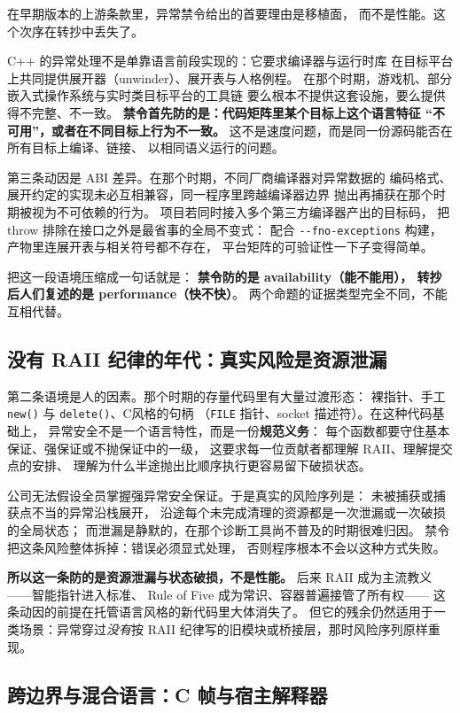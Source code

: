 \documentclass[12pt,a4paper,fontset=fandol]{ctexbook}
\newcommand{\Fn}[1]{\texttt{#1()}}
\newcommand{\Tp}[1]{\texttt{#1}}
\newcommand{\Opt}[1]{\texttt{-\/-#1}}
\newcommand{\Lang}[1]{\textsf{#1}}
\newcommand{\CL}{\Lang{C}}
\newcommand{\CPP}{\Lang{C++}}
\begin{document}
在早期版本的上游条款里，异常禁令给出的首要理由是移植面，
而不是性能。这个次序在转抄中丢失了。

\CPP{} 的异常处理不是单靠语言前段实现的：它要求编译器与运行时库
在目标平台上共同提供展开器（unwinder）、展开表与人格例程。
在那个时期，游戏机、部分嵌入式操作系统与实时类目标平台的工具链
要么根本不提供这套设施，要么提供得不完整、不一致。
\textbf{禁令首先防的是：代码矩阵里某个目标上这个语言特征
``不可用''，或者在不同目标上行为不一致。}
这不是速度问题，而是同一份源码能否在所有目标上编译、链接、
以相同语义运行的问题。

第三条动因是 ABI 差异。在那个时期，不同厂商编译器对异常数据的
编码格式、展开约定的实现未必互相兼容，同一程序里跨越编译器边界
抛出再捕获在那个时期被视为不可依赖的行为。
项目若同时接入多个第三方编译器产出的目标码，
把 throw 排除在接口之外是最省事的全局不变式：
配合 \Opt{fno-exceptions} 构建，产物里连展开表与相关符号都不存在，
平台矩阵的可验证性一下子变得简单。

把这一段语境压缩成一句话就是：
\textbf{禁令防的是 availability（能不能用），
转抄后人们复述的是 performance（快不快）}。
两个命题的证据类型完全不同，不能互相代替。

\subsection{没有 RAII 纪律的年代：真实风险是资源泄漏}
\label{ch:ch11-raii}

第二条语境是人的因素。那个时期的存量代码里有大量过渡形态：
裸指针、手工 \Fn{new} 与 \Fn{delete}、\CL 风格的句柄
（\Tp{FILE} 指针、socket 描述符）。在这种代码基础上，
异常安全不是一个语言特性，而是一份\textbf{规范义务}：
每个函数都要守住基本保证、强保证或不抛保证中的一级，
这要求每一位贡献者都理解 RAII、理解提交点的安排、
理解为什么半途抛出比顺序执行更容易留下破损状态。

公司无法假设全员掌握强异常安全保证。于是真实的风险序列是：
未被捕获或捕获点不当的异常沿栈展开，
沿途每个未完成清理的资源都是一次泄漏或一次破损的全局状态；
而泄漏是静默的，在那个诊断工具尚不普及的时期很难归因。
禁令把这条风险整体拆掉：错误必须显式处理，
否则程序根本不会以这种方式失败。

\textbf{所以这一条防的是资源泄漏与状态破损，不是性能。}
后来 RAII 成为主流教义——智能指针进入标准、
Rule of Five 成为常识、容器普遍接管了所有权——
这条动因的前提在托管语言风格的新代码里大体消失了。
但它的残余仍然适用于一类场景：异常穿过\emph{没有}按 RAII
纪律写的旧模块或桥接层，那时风险序列原样重现。

\subsection{跨边界与混合语言：C 帧与宿主解释器}
\label{ch:ch11-host}
\end{document}
